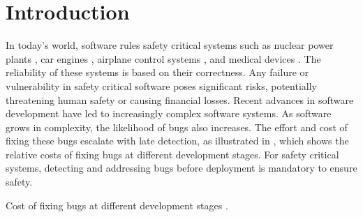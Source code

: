 \setchapterpreamble[u]{\margintoc}


\chapter{Introduction}

\marginemptybox{3cm}
In today's world, software rules safety critical systems such as nuclear power plants ,
car engines ,
airplane control systems
,
and medical devices .
The reliability of these systems is based on their correctness.
Any failure or vulnerability in safety critical software poses significant risks, potentially threatening human safety or causing financial losses.
Recent advances in software development have led to increasingly complex software systems.
As software grows in complexity, the likelihood of bugs also increases.
The effort and cost of fixing these bugs escalate with late detection, as illustrated in  , which shows the relative costs of fixing bugs at different development stages.
For safety critical systems, detecting and addressing bugs before deployment is mandatory to ensure safety.

\begin{margintable}
  \caption{Cost of fixing bugs at different development stages \cite{White2017}.}
  \centering
\end{margintable}



